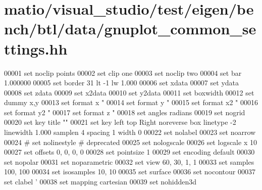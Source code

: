 \hypertarget{matio_2visual__studio_2test_2eigen_2bench_2btl_2data_2gnuplot__common__settings_8hh_source}{}\section{matio/visual\+\_\+studio/test/eigen/bench/btl/data/gnuplot\+\_\+common\+\_\+settings.hh}
\label{matio_2visual__studio_2test_2eigen_2bench_2btl_2data_2gnuplot__common__settings_8hh_source}

\begin{DoxyCode}
00001 \textcolor{keyword}{set} noclip points
00002 \textcolor{keyword}{set} clip one
00003 \textcolor{keyword}{set} noclip two
00004 \textcolor{keyword}{set} bar 1.000000
00005 set border 31 lt -1 lw 1.000
00006 set xdata
00007 \textcolor{keyword}{set} ydata
00008 \textcolor{keyword}{set} zdata
00009 \textcolor{keyword}{set} x2data
00010 \textcolor{keyword}{set} y2data
00011 \textcolor{keyword}{set} boxwidth
00012 \textcolor{keyword}{set} dummy x,y
00013 \textcolor{keyword}{set} format x \textcolor{stringliteral}{"%
00014 \textcolor{keyword}{set} format y \textcolor{stringliteral}{"%
00015 \textcolor{keyword}{set} format x2 \textcolor{stringliteral}{"%
00016 \textcolor{keyword}{set} format y2 \textcolor{stringliteral}{"%
00017 \textcolor{keyword}{set} format z \textcolor{stringliteral}{"%
00018 \textcolor{keyword}{set} angles radians
00019 \textcolor{keyword}{set} nogrid
00020 \textcolor{keyword}{set} key title \textcolor{stringliteral}{""}
00021 \textcolor{keyword}{set} key left top Right noreverse box linetype -2 linewidth 1.000 samplen 4 spacing 1 width 0
00022 \textcolor{keyword}{set} nolabel
00023 \textcolor{keyword}{set} noarrow
00024 \textcolor{preprocessor}{# set nolinestyle # deprecated}
00025 \textcolor{keyword}{set} nologscale
00026 \textcolor{keyword}{set} logscale x 10
00027 \textcolor{keyword}{set} offsets 0, 0, 0, 0
00028 \textcolor{keyword}{set} pointsize 1
00029 \textcolor{keyword}{set} encoding \textcolor{keywordflow}{default}
00030 \textcolor{keyword}{set} nopolar
00031 \textcolor{keyword}{set} noparametric
00032 \textcolor{keyword}{set} view 60, 30, 1, 1
00033 \textcolor{keyword}{set} samples 100, 100
00034 \textcolor{keyword}{set} isosamples 10, 10
00035 \textcolor{keyword}{set} surface
00036 \textcolor{keyword}{set} nocontour
00037 \textcolor{keyword}{set} clabel \textcolor{stringliteral}{'%
00038 \textcolor{keyword}{set} mapping cartesian
00039 \textcolor{keyword}{set} nohidden3d
}}}}}}
\end{DoxyCode}
